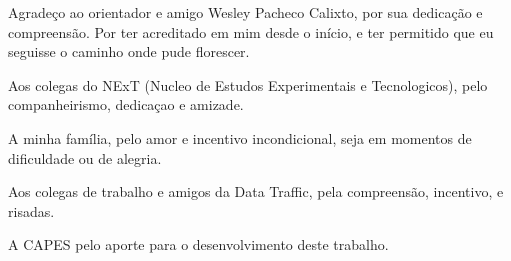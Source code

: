 
\begin{agradecimentos}  %

\hypertarget{estilo:agradecimentos}{} %

Agradeço ao orientador e amigo Wesley Pacheco Calixto, por sua dedicação e compreensão. Por ter acreditado em mim desde o início, e ter permitido que eu seguisse
o caminho onde pude florescer.

Aos colegas do NExT (Nucleo de Estudos Experimentais e Tecnologicos), pelo companheirismo, dedicaçao e amizade.

A minha família, pelo amor e incentivo incondicional, seja em momentos de dificuldade ou de alegria.

Aos colegas de trabalho e amigos da Data Traffic, pela compreensão, incentivo, e risadas.

A CAPES pelo aporte para o desenvolvimento deste trabalho.

\end{agradecimentos}
